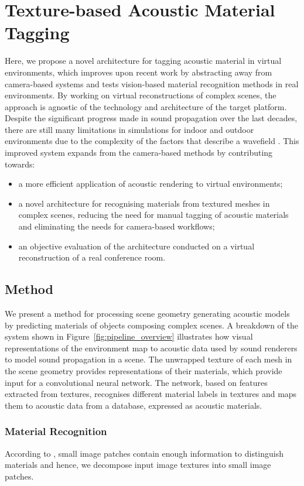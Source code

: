 \section{Texture-based Acoustic Material Tagging}
Here, we propose a novel architecture for tagging acoustic material in virtual environments, which improves upon recent work by abstracting away from camera-based systems and tests vision-based material recognition methods in real environments. By working on virtual reconstructions of complex scenes, the approach is agnostic of the technology and architecture of the target platform. Despite the significant progress made in sound propagation over the last decades, there are still many limitations in simulations for indoor and outdoor environments due to the complexity of the factors that describe a wavefield \cite{liu2020sound}. This improved system expands from the camera-based methods by contributing towards:
\begin{itemize}
    \item a more efficient application of acoustic rendering to virtual environments;
    \item a novel architecture for recognising materials from textured meshes in complex scenes, reducing the need for manual tagging of acoustic materials and eliminating the needs for camera-based workflows; 
    \item an objective evaluation of the architecture conducted on a virtual reconstruction of a real conference room.
\end{itemize}

\subsection{Method}
We present a method for processing scene geometry generating acoustic models by predicting materials of objects composing complex scenes. A breakdown of the system shown in Figure~\ref{fig:pipeline_overview} illustrates how visual representations of the environment map to acoustic data used by sound renderers to model sound propagation in a scene. The unwrapped texture of each mesh in the scene geometry provides representations of their materials, which provide input for a convolutional neural network. The network, based on features extracted from textures, recognises different material labels in textures and maps them to acoustic data from a database, expressed as acoustic materials.

\subsubsection{Material Recognition}
According to \cite{schwartz2019recognizing}, small image patches contain enough information to distinguish materials and hence, we decompose input image textures into small image patches.
